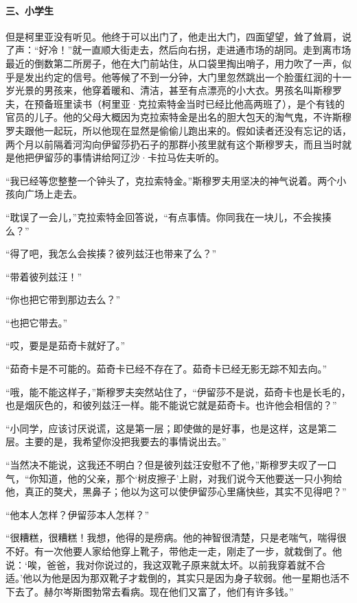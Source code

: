 \paragraph*{三、小学生}
\par 但是柯里亚没有听见。他终于可以出门了，他走出大门，四面望望，耸了耸肩，说了声：“好冷！”就一直顺大街走去，然后向右拐，走进通市场的胡同。走到离市场最近的倒数第二所房子，他在大门前站住，从口袋里掏出哨子，用力吹了一声，似乎是发出约定的信号。他等候了不到一分钟，大门里忽然跳出一个脸蛋红润的十一岁光景的男孩来，他穿着暖和、清洁，甚至有点漂亮的小大衣。男孩名叫斯穆罗夫，在预备班里读书（柯里亚·克拉索特金当时已经比他高两班了），是个有钱的官员的儿子。他的父母大概因为克拉索特金是出名的胆大包天的淘气鬼，不许斯穆罗夫跟他一起玩，所以他现在显然是偷偷儿跑出来的。假如读者还没有忘记的话，两个月以前隔着河沟向伊留莎扔石子的那群小孩里就有这个斯穆罗夫，而且当时就是他把伊留莎的事情讲给阿辽沙·卡拉马佐夫听的。
\par “我已经等您整整一个钟头了，克拉索特金。”斯穆罗夫用坚决的神气说着。两个小孩向广场上走去。
\par “耽误了一会儿，”克拉索特金回答说，“有点事情。你同我在一块儿，不会挨揍么？”
\par “得了吧，我怎么会挨揍？彼列兹汪也带来了么？”
\par “带着彼列兹汪！”
\par “你也把它带到那边去么？”
\par “也把它带去。”
\par “哎，要是是茹奇卡就好了。”
\par “茹奇卡是不可能的。茹奇卡已经不存在了。茹奇卡已经无影无踪不知去向。”
\par “哦，能不能这样子，”斯穆罗夫突然站住了，“伊留莎不是说，茹奇卡也是长毛的，也是烟灰色的，和彼列兹汪一样。能不能说它就是茹奇卡。也许他会相信的？”
\par “小同学，应该讨厌说谎，这是第一层；即使做的是好事，也是这样，这是第二层。主要的是，我希望你没把我要去的事情说出去。”
\par “当然决不能说，这我还不明白？但是彼列兹汪安慰不了他，”斯穆罗夫叹了一口气，“你知道，他的父亲，那个‘树皮擦子’上尉，对我们说今天他要送一只小狗给他，真正的獒犬，黑鼻子；他以为这可以使伊留莎心里痛快些，其实不见得吧？”
\par “他本人怎样？伊留莎本人怎样？”
\par “很糟糕，很糟糕！我想，他得的是痨病。他的神智很清楚，只是老喘气，喘得很不好。有一次他要人家给他穿上靴子，带他走一走，刚走了一步，就栽倒了。他说：‘唉，爸爸，我对你说过的，我这双靴子原来就太坏。以前我穿着就不合适。’他以为他是因为那双靴子才栽倒的，其实只是因为身子软弱。他一星期也活不下去了。赫尔岑斯图勃常去看病。现在他们又富了，他们有许多钱。”
